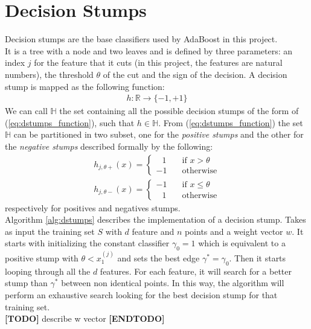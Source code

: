 \chapter{Decision Stumps}
Decision stumps are the base classifiers used by AdaBoost in this project.\\
It is a tree with a node and two leaves and is defined by three parameters: an index $j$ for the feature that it cuts (in this project, the features are natural numbers), the threshold $\theta$ of the cut and the sign of the decision. A decision stump is mapped as the following function:
\begin{align}
\label{eq:dstumps_function}
	h:\mathbb{R} \to \lbrace-1, +1\rbrace
\end{align}
We can call $\mathbb{H}$ the set containing all the possible decision stumps of the form of (\ref{eq:dstumps_function}), such that $h \in \mathbb{H}$. From (\ref{eq:dstumps_function}) the set $\mathbb{H}$ can be partitioned in two subset, one for the \textit{positive stumps} and the other for the \textit{negative stumps} described formally by the following:
\begin{align}
h_{j, \theta+}(x) =
\begin{cases}
\;\;\,1       & \quad \text{if } x > \theta\\
-1  & \quad \text{otherwise}
\end{cases}
\\
h_{j,\theta-}(x) =
\begin{cases}
-1			& \quad \text{if } x \leq \theta\\
\;\;\,1		& \quad \text{otherwise}
\end{cases}
\end{align}
respectively for positives and negatives stumps.\\
Algorithm \ref{alg:dstumps} describes the implementation of a decision stump. Takes as input the training set $S$ with $d$ feature and $n$ points and a weight vector $w$. It starts with initializing the constant classifier $\gamma_{0} = 1$ which is equivalent to a positive stump with $\theta < x_{1}^{(j)}$ and sets the best edge $\gamma^{*} = \gamma_{0}$. Then it starts looping through all the $d$ features. For each feature, it will search for a better stump than $\gamma^{*}$ between non identical points. In this way, the algorithm will perform an exhaustive search looking for the best decision stump for that training set.
\\\textbf{[TODO]} describe w vector \textbf{[ENDTODO]}
